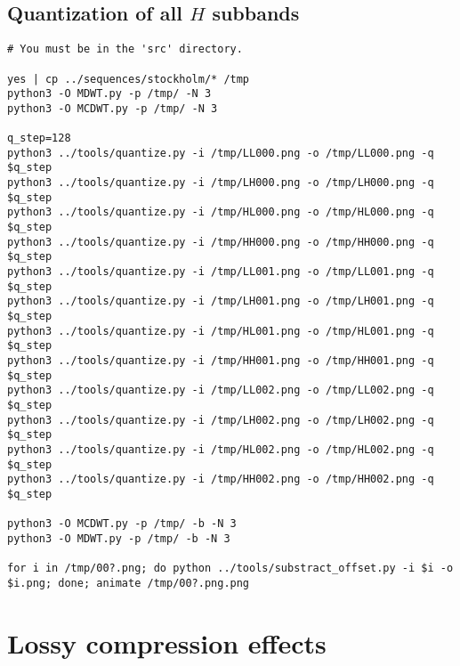 \subsection*{Quantization of all $H$ subbands}
\begin{verbatim}
# You must be in the 'src' directory.

yes | cp ../sequences/stockholm/* /tmp
python3 -O MDWT.py -p /tmp/ -N 3
python3 -O MCDWT.py -p /tmp/ -N 3

q_step=128
python3 ../tools/quantize.py -i /tmp/LL000.png -o /tmp/LL000.png -q $q_step
python3 ../tools/quantize.py -i /tmp/LH000.png -o /tmp/LH000.png -q $q_step
python3 ../tools/quantize.py -i /tmp/HL000.png -o /tmp/HL000.png -q $q_step
python3 ../tools/quantize.py -i /tmp/HH000.png -o /tmp/HH000.png -q $q_step
python3 ../tools/quantize.py -i /tmp/LL001.png -o /tmp/LL001.png -q $q_step
python3 ../tools/quantize.py -i /tmp/LH001.png -o /tmp/LH001.png -q $q_step
python3 ../tools/quantize.py -i /tmp/HL001.png -o /tmp/HL001.png -q $q_step
python3 ../tools/quantize.py -i /tmp/HH001.png -o /tmp/HH001.png -q $q_step
python3 ../tools/quantize.py -i /tmp/LL002.png -o /tmp/LL002.png -q $q_step
python3 ../tools/quantize.py -i /tmp/LH002.png -o /tmp/LH002.png -q $q_step
python3 ../tools/quantize.py -i /tmp/HL002.png -o /tmp/HL002.png -q $q_step
python3 ../tools/quantize.py -i /tmp/HH002.png -o /tmp/HH002.png -q $q_step

python3 -O MCDWT.py -p /tmp/ -b -N 3
python3 -O MDWT.py -p /tmp/ -b -N 3

for i in /tmp/00?.png; do python ../tools/substract_offset.py -i $i -o $i.png; done; animate /tmp/00?.png.png
\end{verbatim}


\section*{Lossy compression effects}

